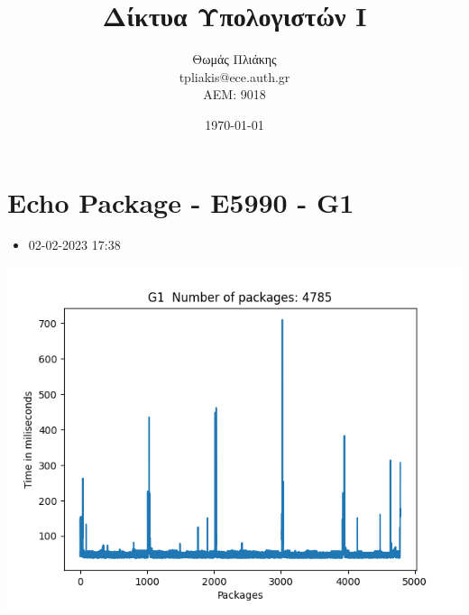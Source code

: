 \documentclass[10pt,a4paper]{article}
\title{ Δίκτυα Υπολογιστών Ι}
\author{Θωμάς Πλιάκης \\ \textlatin{tpliakis@ece.auth.gr} \\ AEM: 9018}
\date{\today}
\begin{document}
\maketitle

\section*{\textlatin{Echo Package - E5990 - G1}}
\begin{itemize}
  \item 02-02-2023 17:38
        \newline
        \newline
        \newline
        \newline
\end{itemize}
\begin{center}
  \includegraphics[scale=0.8]{G1.png}
  \newline
  \newline
  \newline
  \newline
  \newline
  \newline
  \newline
  \newline
  \newline
  \newline
  \newline
  \newline
  \newline
  \newline
\end{center}
\end{document}
